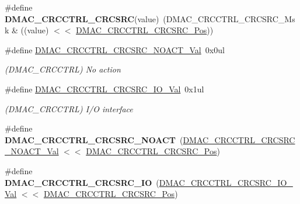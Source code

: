 \begin{DoxyCompactItemize}
\item 
\hypertarget{group___s_a_m_l21___d_m_a_c_ga9f47a6ccfb40d4cae0bc14ff788b3537}{}\#define {\bfseries D\+M\+A\+C\+\_\+\+C\+R\+C\+C\+T\+R\+L\+\_\+\+C\+R\+C\+S\+R\+C}(value)~(D\+M\+A\+C\+\_\+\+C\+R\+C\+C\+T\+R\+L\+\_\+\+C\+R\+C\+S\+R\+C\+\_\+\+Msk \& ((value) $<$$<$ \hyperlink{group___s_a_m_l21___d_m_a_c_gadc538250fa40a515d90fc7bbde4c5f83}{D\+M\+A\+C\+\_\+\+C\+R\+C\+C\+T\+R\+L\+\_\+\+C\+R\+C\+S\+R\+C\+\_\+\+Pos}))\label{group___s_a_m_l21___d_m_a_c_ga9f47a6ccfb40d4cae0bc14ff788b3537}

\item 
\hypertarget{group___s_a_m_l21___d_m_a_c_gabd02bb4af60ae9d0d21a167d617a37d1}{}\#define \hyperlink{group___s_a_m_l21___d_m_a_c_gabd02bb4af60ae9d0d21a167d617a37d1}{D\+M\+A\+C\+\_\+\+C\+R\+C\+C\+T\+R\+L\+\_\+\+C\+R\+C\+S\+R\+C\+\_\+\+N\+O\+A\+C\+T\+\_\+\+Val}~0x0ul\label{group___s_a_m_l21___d_m_a_c_gabd02bb4af60ae9d0d21a167d617a37d1}

\begin{DoxyCompactList}\small\item\em (D\+M\+A\+C\+\_\+\+C\+R\+C\+C\+T\+R\+L) No action \end{DoxyCompactList}\item 
\hypertarget{group___s_a_m_l21___d_m_a_c_ga27de0e68d8f9d1d90dd2e683b1b8206c}{}\#define \hyperlink{group___s_a_m_l21___d_m_a_c_ga27de0e68d8f9d1d90dd2e683b1b8206c}{D\+M\+A\+C\+\_\+\+C\+R\+C\+C\+T\+R\+L\+\_\+\+C\+R\+C\+S\+R\+C\+\_\+\+I\+O\+\_\+\+Val}~0x1ul\label{group___s_a_m_l21___d_m_a_c_ga27de0e68d8f9d1d90dd2e683b1b8206c}

\begin{DoxyCompactList}\small\item\em (D\+M\+A\+C\+\_\+\+C\+R\+C\+C\+T\+R\+L) I/\+O interface \end{DoxyCompactList}\item 
\hypertarget{group___s_a_m_l21___d_m_a_c_ga5a7b9210edee66a08c19577a9718cbc1}{}\#define {\bfseries D\+M\+A\+C\+\_\+\+C\+R\+C\+C\+T\+R\+L\+\_\+\+C\+R\+C\+S\+R\+C\+\_\+\+N\+O\+A\+C\+T}~(\hyperlink{group___s_a_m_l21___d_m_a_c_gabd02bb4af60ae9d0d21a167d617a37d1}{D\+M\+A\+C\+\_\+\+C\+R\+C\+C\+T\+R\+L\+\_\+\+C\+R\+C\+S\+R\+C\+\_\+\+N\+O\+A\+C\+T\+\_\+\+Val} $<$$<$ \hyperlink{group___s_a_m_l21___d_m_a_c_gadc538250fa40a515d90fc7bbde4c5f83}{D\+M\+A\+C\+\_\+\+C\+R\+C\+C\+T\+R\+L\+\_\+\+C\+R\+C\+S\+R\+C\+\_\+\+Pos})\label{group___s_a_m_l21___d_m_a_c_ga5a7b9210edee66a08c19577a9718cbc1}

\item 
\hypertarget{group___s_a_m_l21___d_m_a_c_gaf274b789f2a39e9f18e2f06686815cc7}{}\#define {\bfseries D\+M\+A\+C\+\_\+\+C\+R\+C\+C\+T\+R\+L\+\_\+\+C\+R\+C\+S\+R\+C\+\_\+\+I\+O}~(\hyperlink{group___s_a_m_l21___d_m_a_c_ga27de0e68d8f9d1d90dd2e683b1b8206c}{D\+M\+A\+C\+\_\+\+C\+R\+C\+C\+T\+R\+L\+\_\+\+C\+R\+C\+S\+R\+C\+\_\+\+I\+O\+\_\+\+Val}    $<$$<$ \hyperlink{group___s_a_m_l21___d_m_a_c_gadc538250fa40a515d90fc7bbde4c5f83}{D\+M\+A\+C\+\_\+\+C\+R\+C\+C\+T\+R\+L\+\_\+\+C\+R\+C\+S\+R\+C\+\_\+\+Pos})\label{group___s_a_m_l21___d_m_a_c_gaf274b789f2a39e9f18e2f06686815cc7}


\end{DoxyCompactItemize}
